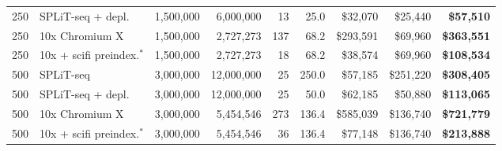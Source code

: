 \begin{table}[htbp]
\begin{tabular}{rlrrrrrrr}
250 & SPLiT-seq + depl. & 1{,}500{,}000 & 6{,}000{,}000 & 13 & 25.0 & \$32{,}070 & \$25{,}440 & \textbf{\$57{,}510} \\
250 & 10x Chromium X & 1{,}500{,}000 & 2{,}727{,}273 & 137 & 68.2 & \$293{,}591 & \$69{,}960 & \textbf{\$363{,}551} \\
250 & 10x + scifi preindex.$^{\ast}$ & 1{,}500{,}000 & 2{,}727{,}273 & 18 & 68.2 & \$38{,}574 & \$69{,}960 & \textbf{\$108{,}534} \\
500 & SPLiT-seq & 3{,}000{,}000 & 12{,}000{,}000 & 25 & 250.0 & \$57{,}185 & \$251{,}220 & \textbf{\$308{,}405} \\
500 & SPLiT-seq + depl. & 3{,}000{,}000 & 12{,}000{,}000 & 25 & 50.0 & \$62{,}185 & \$50{,}880 & \textbf{\$113{,}065} \\
500 & 10x Chromium X & 3{,}000{,}000 & 5{,}454{,}546 & 273 & 136.4 & \$585{,}039 & \$136{,}740 & \textbf{\$721{,}779} \\
500 & 10x + scifi preindex.$^{\ast}$ & 3{,}000{,}000 & 5{,}454{,}546 & 36 & 136.4 & \$77{,}148 & \$136{,}740 & \textbf{\$213{,}888} \\
\bottomrule
\end{tabular}
\end{table}
